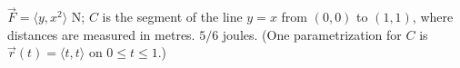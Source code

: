 {$\vec F = \langle y,x^2\rangle$ N; $C$ is the segment of the line $y=x$ from $(0,0)$ to $(1,1)$, where distances are measured in metres.
}
{$5/6$ joules. (One parametrization for $C$ is $\vec r(t) = \langle t,t\rangle$ on $0\leq t\leq 1$.)
}
